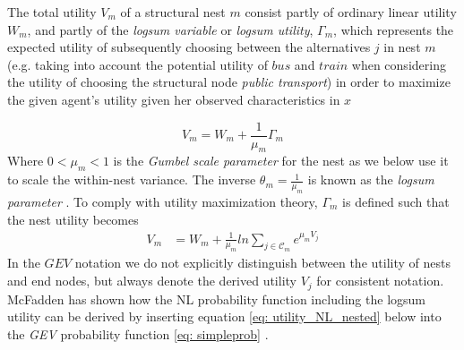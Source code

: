 The total utility $V_m$ of a structural nest $m$ consist partly of ordinary linear utility $W_m$, and partly of the \textit{logsum variable} or \textit{logsum utility}, $\Gamma_{m}$, which represents the expected utility of subsequently choosing between the alternatives $j$ in nest $m$ (e.g. taking into account the potential utility of $bus$ and $train$ when considering the utility of choosing the structural node \textit{public transport}) in order to maximize the given agent's utility given her observed characteristics in $x$ \citep{koppelman_self_2006}

  \begin{equation} \label{eq: NL_expected_utility}
    V_{m}=W_{m}+\frac{1}{\mu_{m}} \Gamma_m
  \end{equation}
Where $0<\mu_{m}<1$ is the \textit{Gumbel scale parameter} for the nest as we below use it to scale the within-nest variance. The inverse $\theta_{m}=\frac{1}{\mu_{m}}$ is known as the \textit{logsum parameter} \citep{koppelman_self_2006}. To comply with utility maximization theory, $\Gamma_m$ is defined such that the nest utility becomes
   \begin{equation} \label{eq: NL_deterministic_nest}
    \begin{split}
     V_{m} &= W_{m} + \frac{1}{\mu_{m}}
     ln\sum\limits_{j\in\mathcal{C}_{m}}e^{\mu_{m}V_j} %
    \end{split}
   \end{equation}
In the $GEV$ notation we do not explicitly distinguish between the utility of nests and end nodes, but always denote the derived utility $V_j$ for consistent notation. McFadden has shown how the NL probability function including the logsum utility can be derived by inserting equation \eqref{eq: utility_NL_nested} below into the \textit{GEV} probability function \eqref{eq: simpleprob} \citep{mcfadden_quantitative_1977, train_discrete_2009}.
%
